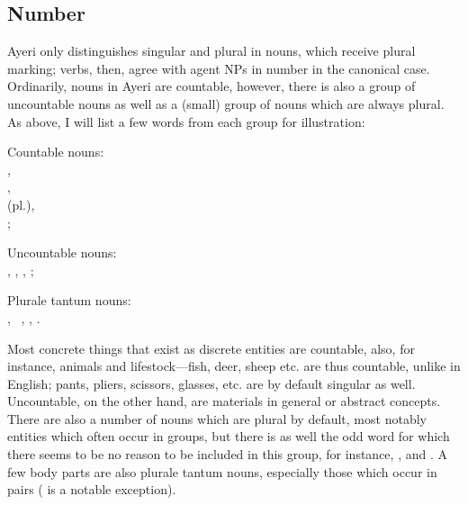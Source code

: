 
\subsection{Number}

Ayeri only distinguishes singular and plural in nouns, which receive plural 
marking; verbs, then, agree with agent NPs in number in the canonical case. 
Ordinarily, nouns in Ayeri are countable, however, there is also a group of 
uncountable nouns as well as a (small) group of nouns which are always plural. 
As above, I will list a few words from each group for illustration:

\pex
	\a Countable nouns:\label{ex:plurals}\\[0.5\baselineskip]
			\makebox[2em][c]{---}
			, %
				\\[0.5\baselineskip]
			\makebox[2em][c]{---}
			, %
				\\[0.5\baselineskip]
			\makebox[2em][c]{---}
			 (pl.),%
				\\[0.5\baselineskip]
			\makebox[2em][c]{---}
			;
	
	\a Uncountable nouns:\\
		, 
		, 
		, 
		;
	
	\a Plurale tantum nouns:\\
		,\footnotemark~
		, 
		, 
		.
\xe


Most concrete things that exist as discrete entities are countable, also, for 
instance, animals and lifestock---fish, deer, sheep etc. are thus countable, 
unlike in English; pants, pliers, scissors, glasses, etc. are by default 
singular as well. Uncountable, on the other hand, are materials in general or 
abstract concepts. There are also a number of nouns which are plural by 
default, 
most notably entities which often occur in groups, but there is as well the odd 
word for which there seems to be no reason to be included in this group, for 
instance, , and . A few 
body parts are also plurale tantum nouns, especially those which occur in pairs 
( is a notable exception).

